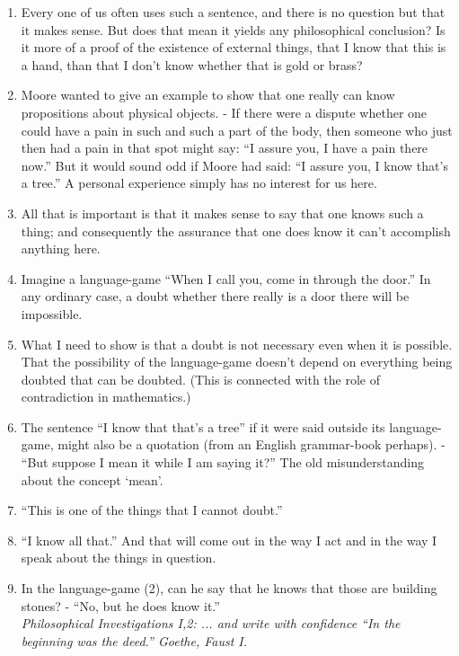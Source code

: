 \documentclass{book}
\begin{document}
\begin{enumerate}
\item
Every one of us often uses such a sentence, and there is no question but that
it makes sense. But does that mean it yields any philosophical conclusion? Is
it more of a proof of the existence of external things, that I know that this
is a hand, than that I don't know whether that is gold or brass?

\item
Moore wanted to give an example to show that one really can know propositions
about physical objects. - If there were a dispute whether one could have a pain
in such and such a part of the body, then someone who just then had a pain in
that spot might say: ``I assure you, I have a pain there now.'' But it would
sound odd if Moore had said: ``I assure you, I know that's a tree.'' A personal
experience simply has no interest for us here.

\item
All that is important is that it makes sense to say that one knows such a
thing; and consequently the assurance that one does know it can't accomplish
anything here.

\item
Imagine a language-game ``When I call you, come in through the door.'' In any
ordinary case, a doubt whether there really is a door there will be impossible.

\item
What I need to show is that a doubt is not necessary even when it is possible.
That the possibility of the language-game doesn't depend on everything being
doubted that can be doubted. (This is connected with the role of contradiction
in mathematics.)

\item
The sentence ``I know that that's a tree'' if it were said outside its
language-game, might also be a quotation (from an English grammar-book
perhaps). - ``But suppose I mean it while I am saying it?'' The old
misunderstanding about the concept `mean'.

\item
``This is one of the things that I cannot doubt.''

\item
``I know all that.'' And that will come out in the way I act and in the way I
speak about the things in question.

\item
In the language-game (2), can he say that he knows that those are building
stones? - ``No, but he does know it.''
\\
\emph{Philosophical Investigations I,2: ... and write with confidence ``In the
beginning was the deed.'' Goethe, Faust I.}


\end{enumerate}
\end{document}
